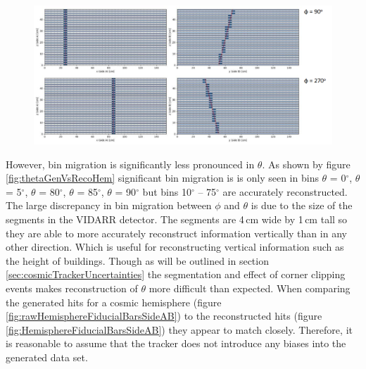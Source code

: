 \begin{figure}[!h]
 \centering
 \includegraphics[width=\linewidth]{Chapter5/Figs/cosmicBinMigrationSideB.png}
 \label{fig:cosmicBinMigrationSideB}
\end{figure}

However, bin migration is significantly less pronounced in $\theta$. As shown by figure \ref{fig:thetaGenVsRecoHem} significant bin migration is is only seen in bins $\theta$ = 0$^\circ$, $\theta$ = 5$^\circ$, $\theta$ = 80$^\circ$, $\theta$ = 85$^\circ$, $\theta$ = 90$^\circ$ but bins 10$^\circ$ -- 75$^\circ$ are accurately reconstructed. The large discrepancy in bin migration between $\phi$ and $\theta$ is due to the size of the segments in the VIDARR detector. The segments are 4\,cm wide by 1\,cm tall so they are able to more accurately reconstruct information vertically than in any other direction. Which is useful for reconstructing vertical information such as the height of buildings. Though as will be outlined in section \ref{sec:cosmicTrackerUncertainties} the segmentation and effect of corner clipping events makes reconstruction of $\theta$ more difficult than expected. When comparing the generated hits for a cosmic hemisphere (figure \ref{fig:rawHemisphereFiducialBarsSideAB}) to the reconstructed hits (figure \ref{fig:HemisphereFiducialBarsSideAB}) they appear to match closely. Therefore, it is reasonable to assume that the tracker does not introduce any biases into the generated data set.

